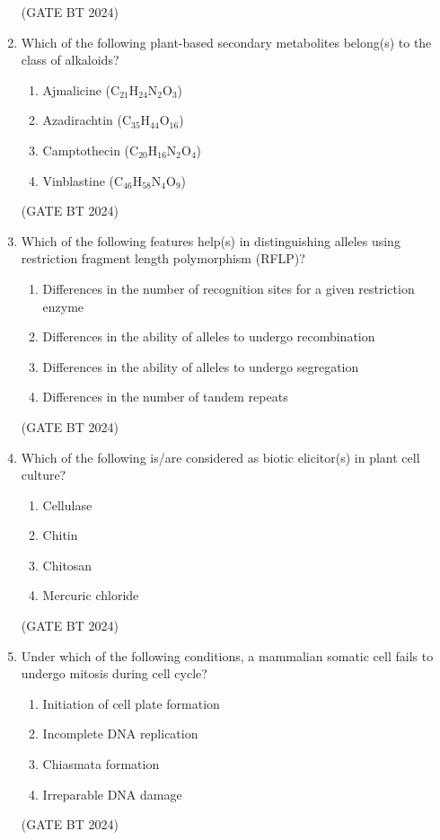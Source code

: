\documentclass[journal,12pt,onecolumn]{IEEEtran}
\theoremstyle{remark}
\begin{document}
\begin{enumerate}
\hfill (GATE BT 2024)

\item Which of the following plant-based secondary metabolites belong(s) to the class of alkaloids?

\begin{enumerate}
    \item Ajmalicine (C$_{21}$H$_{24}$N$_2$O$_3$) 
    \item Azadirachtin (C$_{35}$H$_{44}$O$_{16}$) 
    \item Camptothecin (C$_{20}$H$_{16}$N$_2$O$_4$) 
    \item Vinblastine (C$_{46}$H$_{58}$N$_4$O$_9$)
\end{enumerate}

\hfill (GATE BT 2024)

\item Which of the following features help(s) in distinguishing alleles using restriction fragment length polymorphism (RFLP)?

\begin{enumerate}
    \item Differences in the number of recognition sites for a given restriction enzyme 
    \item Differences in the ability of alleles to undergo recombination 
    \item Differences in the ability of alleles to undergo segregation 
    \item Differences in the number of tandem repeats
\end{enumerate}

\hfill (GATE BT 2024)

\item Which of the following is/are considered as biotic elicitor(s) in plant cell culture?
\begin{multicols}{2}
\begin{enumerate}
\item Cellulase 
\item Chitin 
\item Chitosan 
\item Mercuric chloride
\end{enumerate}
\end{multicols}

\hfill (GATE BT 2024)

\item Under which of the following conditions, a mammalian somatic cell fails to undergo mitosis during cell cycle?
\begin{multicols}{2}
\begin{enumerate}
\item Initiation of cell plate formation 
\item Incomplete DNA replication 
\item Chiasmata formation 
\item Irreparable DNA damage
\end{enumerate}
\end{multicols}
\hfill (GATE BT 2024)


\end{enumerate}
\end{document}
